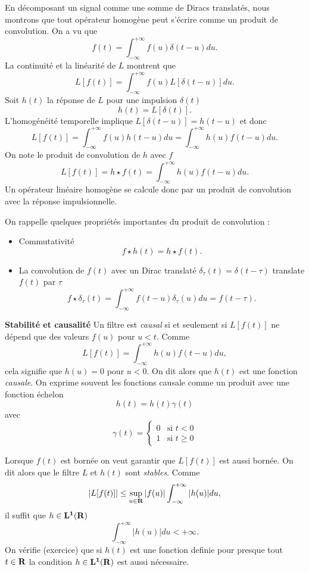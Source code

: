 En d\'ecomposant un signal comme une somme de Diracs translat\'es, nous
montrons que tout op\'erateur homog\`ene peut s'\'ecrire comme un
produit de convolution.
On a vu que
\[
f(t) = \int_{-\infty}^{+\infty} f(u) \delta (t-u) du .
\]
La continuit\'e et la lin\'earit\'e de $L$ montrent que
\[
L[f (t)] = \int_{-\infty}^{+\infty} f(u) L[\delta(t-u)] du .
\]
Soit $h(t)$ la r\'eponse de $L$ pour une impulsion $\delta (t)$
\[
h(t) = L[\delta (t)] .
\]
L'homog\'en\'eit\'e temporelle implique 
$L[\delta (t-u)] = h(t-u)$ et donc
\[
L[f (t)] = \int_{-\infty}^{+\infty} f(u) h (t-u)  du 
= \int_{-\infty}^{+\infty} h (u) f(t-u) du .
\]
On note le produit de convolution de $h$ avec $f$
\[
L[f (t)] = 
h \star f (t) = \int_{-\infty}^{+\infty} h (u) f(t-u) du .
\]
Un op\'erateur lin\'eaire homog\`ene se calcule donc par un produit
de convolution avec la r\'eponse impulsionnelle.

On rappelle quelques propri\'et\'es importantes du produit de convolution :
\begin{itemize}
\item Commutativit\'e
\begin{equation}
f \star h (t) = h \star f (t) .
\end{equation}
\item La convolution de $f(t)$ avec un Dirac translat\'e
$\delta_\tau (t) = \delta (t-\tau)$ translate
$f(t)$ par $\tau$
\begin{equation}
f \star \delta_\tau (t) = 
\int_{-\infty}^{+\infty} f (t-u) \delta_\tau (u) du  = f(t-\tau).
\end{equation}
\end{itemize}

{\bf Stabilit\'e et causalit\'e}
Un filtre est {\it causal} si et seulement si
$L[f(t)]$ ne d\'epend que des valeurs $f(u)$ pour $u < t$.
Comme
\[
L[f(t)]  = \int_{-\infty}^{+\infty} h (u) f(t-u) du ,
\]
cela signifie que $h(u) = 0$ pour $u < 0$. On dit alors que
$h(t)$ est une fonction {\it causale}. On exprime souvent les
fonctions causale comme un produit avec une 
fonction \'echelon
\[
h(t) = h(t) \gamma (t)
\]
avec
\begin{equation}
\label{Heavyside}
\gamma (t) = \left\{
\begin{array}{ll}
0 & \mbox{si $t < 0$}\\
1 & \mbox{si $t \geq 0$}
\end{array}
\right.
\end{equation}

Lorsque $f(t)$ est born\'ee on
veut garantir que $L[f(t)]$ est aussi born\'ee.
On dit alors que le filtre $L$ et $h(t)$ sont {\it stables}.
Comme
\begin{equation}
\label{stab-cond}
|L[f(t)]| \leq \sup_{u \in {\bf{R}}} |f(u)| 
\int_{-\infty}^{+\infty} |h (u)| du ,
\end{equation}
il suffit que $h \in {\bf L ^ 1 ({\bf{R}})}$
\[
\int_{-\infty}^{+\infty} |h (u)| du < + \infty .
\]
On v\'erifie (exercice) que si $h(t)$ est une fonction definie
pour presque tout $t \in {\bf{R}}$
la condition $h \in {\bf L ^ 1 ({\bf{R}})}$ est aussi n\'ecessaire.\\
\\
\\


